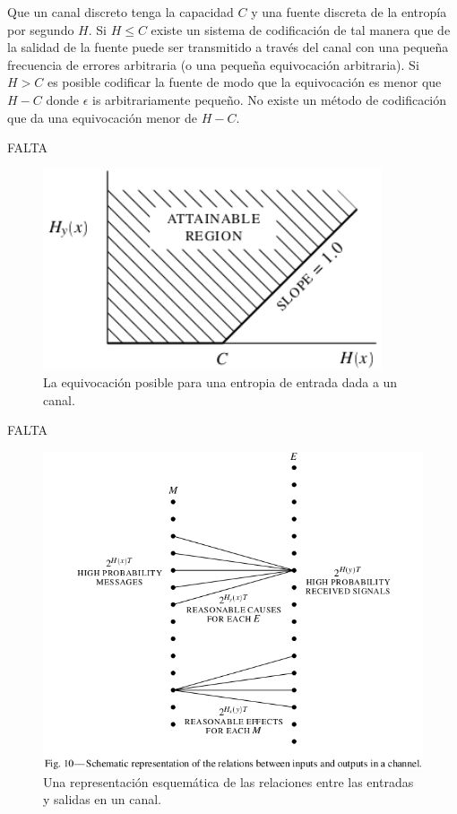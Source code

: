 \begin{theorem}
\label{th:11}
Que un canal discreto tenga la capacidad $C$ y una fuente discreta de la entrop\'{i}a por segundo $H$. Si $H \leq C$ existe un sistema de codificaci\'{o}n de tal manera que de la salidad de la fuente puede ser transmitido a trav\'{e}s del canal con una peque\~{n}a frecuencia de errores arbitraria (o una peque\~{n}a equivocaci\'{o}n arbitraria). Si $H > C$ es posible codificar la fuente de modo que la equivocaci\'{o}n es menor que $H - C$ donde $\epsilon$ is arbitrariamente peque\~{n}o. No existe un m\'{e}todo de codificaci\'{o}n que da una equivocaci\'{o}n menor de $H - C$.
\end{theorem}

FALTA

\begin{figure}[!ht]
\centerline{\includegraphics[width=100mm]{Imagenes/SinComentarios/Pagina22-Figura9.png}}
\caption{La equivocaci\'{o}n posible para una entropia de entrada dada
  a un canal.}
\label{fig:9}
\end{figure}

FALTA

\begin{figure}[!ht]
\centerline{\includegraphics[width=140mm]{Imagenes/Pagina23-Figura10.png}}
\caption{Una representaci\'{o}n esquem\'{a}tica de las relaciones
  entre las entradas y salidas en un canal.}
\label{fig:10}
\end{figure}

